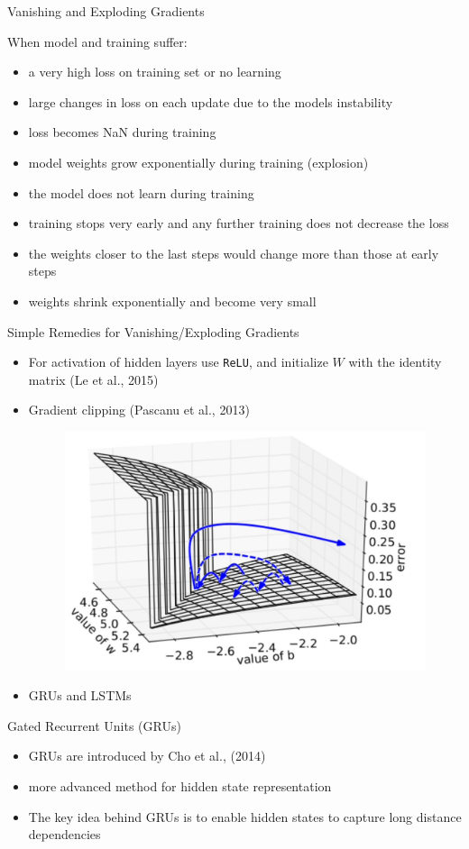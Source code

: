 \documentclass[12pt]{beamer}
\begin{document}
\begin{frame}{Vanishing and Exploding Gradients}
	
	When model and training suffer:
	\begin{itemize}
		\item a very high loss on training set or no learning
		\item large changes in loss on each update due to the models instability
		\item loss becomes NaN during training
		\item model weights grow exponentially during training (explosion)
		\item the model does not learn during training
		\item training stops very early and any further training does not decrease the loss
		\item the weights closer to the last steps would  change more than those at early steps
		\item weights shrink exponentially and become very small
	\end{itemize}
\end{frame}
\begin{frame}{Simple Remedies for Vanishing/Exploding Gradients}
	\begin{itemize}
		\item For activation of hidden layers use \texttt{ReLU}, and initialize $W$ with the identity matrix (Le et al., 2015)
		\item Gradient clipping (Pascanu et al., 2013)
		\begin{figure}
			\centering
			\includegraphics[scale=0.09]{./img/gradient_clipping.png}
		\end{figure}
		\item GRUs and LSTMs
	\end{itemize}
\end{frame}
\begin{frame}{Gated Recurrent Units (GRUs)}
	\begin{itemize}
		\item GRUs are introduced by Cho et al., (2014)
		\item more advanced method for hidden state representation
		\item The key idea behind GRUs is to enable hidden states to capture long distance dependencies
	\end{itemize}
\end{frame}
\end{document}
